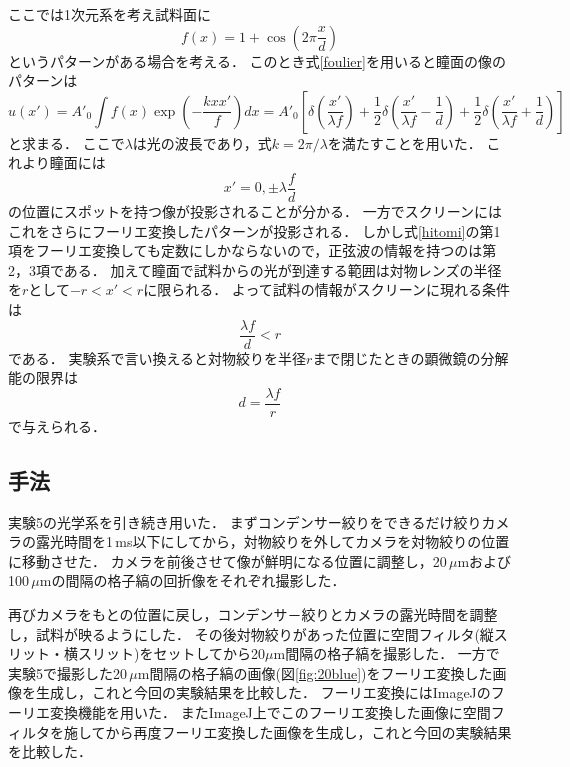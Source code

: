 \documentclass[titlepage]{jsarticle}
\begin{document}
ここでは1次元系を考え試料面に
\begin{equation}
    f(x) = 1 + \cos \left(2\pi \frac{x}{d}\right)
\end{equation}
というパターンがある場合を考える．
このとき式\eqref{foulier}を用いると瞳面の像のパターンは
\begin{equation}
    u(x') = A'_0 \int f(x) \exp \left(-\frac{kxx'}{f}\right) dx = A'_0 \left[ \delta \left(\frac{x'}{\lambda f}\right) +\frac{1}{2} \delta \left(\frac{x'}{\lambda f} - \frac{1}{d} \right) + \frac{1}{2} \delta \left(\frac{x'}{\lambda f} + \frac{1}{d}\right) \right]
    \label{hitomi}
\end{equation}
と求まる．
ここで$\lambda$は光の波長であり，式$k = 2\pi / \lambda$を満たすことを用いた．
これより瞳面には
\begin{equation}
    x' = 0, \pm \lambda \frac{f}{d} \label{spot}
\end{equation}
の位置にスポットを持つ像が投影されることが分かる．
一方でスクリーンにはこれをさらにフーリエ変換したパターンが投影される．
しかし式\eqref{hitomi}の第1項をフーリエ変換しても定数にしかならないので，正弦波の情報を持つのは第2，3項である．
加えて瞳面で試料からの光が到達する範囲は対物レンズの半径を$r$として$-r<x'<r$に限られる．
よって試料の情報がスクリーンに現れる条件は
\begin{equation}
    \frac{\lambda f}{d} < r 
\end{equation}
である．
実験系で言い換えると対物絞りを半径$r$まで閉じたときの顕微鏡の分解能の限界は
\begin{equation}
    d = \frac{\lambda f}{r}
\end{equation}
で与えられる．

\subsection{手法}
実験5の光学系を引き続き用いた．
まずコンデンサー絞りをできるだけ絞りカメラの露光時間を1\,ms以下にしてから，対物絞りを外してカメラを対物絞りの位置に移動させた．
カメラを前後させて像が鮮明になる位置に調整し，20\,$\mu$mおよび100\,$\mu$mの間隔の格子縞の回折像をそれぞれ撮影した．

再びカメラをもとの位置に戻し，コンデンサ－絞りとカメラの露光時間を調整し，試料が映るようにした．
その後対物絞りがあった位置に空間フィルタ(縦スリット・横スリット)をセットしてから20$\mu$m間隔の格子縞を撮影した．
一方で実験5で撮影した20\,$\mu$m間隔の格子縞の画像(図\ref{fig:20blue})をフーリエ変換した画像を生成し，これと今回の実験結果を比較した．
フーリエ変換にはImageJのフーリエ変換機能を用いた．
またImageJ上でこのフーリエ変換した画像に空間フィルタを施してから再度フーリエ変換した画像を生成し，これと今回の実験結果を比較した．
\end{document}
